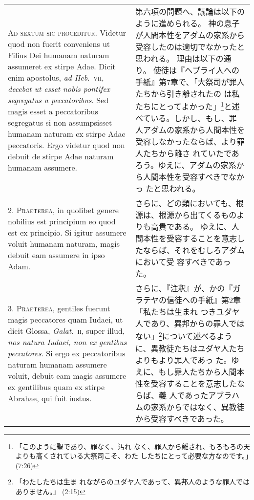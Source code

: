 \documentclass[10pt]{jsarticle} %
\begin{document}
\begin{longtable}{p{21em}p{21em}}

{\Huge A}{\scshape d sextum sic proceditur}. Videtur quod non fuerit conveniens ut Filius
Dei humanam naturam assumeret ex stirpe Adae. Dicit enim apostolus, {\itshape ad
Heb}.~{\scshape vii}, {\itshape decebat ut esset nobis pontifex segregatus a peccatoribus}. Sed
magis esset a peccatoribus segregatus si non assumpsisset humanam
naturam ex stirpe Adae peccatoris. Ergo videtur quod non debuit de
stirpe Adae naturam humanam assumere.


&

第六項の問題へ、議論は以下のように進められる。
神の息子が人間本性をアダムの家系から受容したのは適切でなかったと思われる。
 理由は以下の通り。
使徒は『ヘブライ人への手紙』第7章で、「大祭司が罪人たちから引き離されたの
 は私たちにとってよかった」\footnote{「このように聖であり、罪なく、汚れ
 なく、罪人から離され、もろもろの天よりも高くされている大祭司こそ、わた
 したちにとって必要な方なのです。」(7:26)}と述べている。しかし、もし、罪
 人アダムの家系から人間本性を受容しなかったならば、より罪人たちから離さ
 れていたであろう。ゆえに、アダムの家系から人間本性を受容すべきでなかっ
 たと思われる。

\\



2. {\scshape Praeterea}, in quolibet genere nobilius est principium eo quod est ex
principio. Si igitur assumere voluit humanam naturam, magis debuit eam
assumere in ipso Adam.


&

さらに、どの類においても、根源は、根源から出てくるものよりも高貴である。
 ゆえに、人間本性を受容することを意志したならば、それをむしろアダムにおいて受
 容すべきであった。

\\



3. {\scshape Praeterea}, gentiles fuerunt magis peccatores quam Iudaei, ut dicit
Glossa, {\itshape Galat}.~{\scshape ii}, super illud, {\itshape nos natura Iudaei, non ex gentibus
peccatores}. Si ergo ex peccatoribus naturam humanam assumere voluit,
debuit eam magis assumere ex gentilibus quam ex stirpe Abrahae, qui fuit
iustus.


&

さらに、『注釈』が、かの『ガラテヤの信徒への手紙』第2章「私たちは生まれ
 つきユダヤ人であり、異邦からの罪人ではない」\footnote{「わたしたちは生ま
 れながらのユダヤ人であって、異邦人のような罪人ではありません。」
 (2:15)}について述べるように、異教徒たちはユダヤ人たちよりもより罪人であっ
 た。ゆえに、もし罪人たちから人間本性を受容することを意志したならば、義
 人であったアブラハムの家系からではなく、異教徒から受容すべきであった。



\end{longtable}
\end{document}

